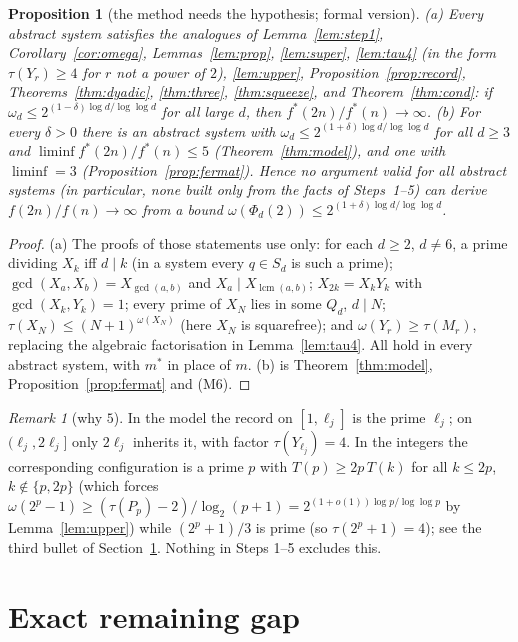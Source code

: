 \documentclass[11pt]{article}
\newtheorem{proposition}[theorem]{Proposition}
\theoremstyle{remark}
\newtheorem{remark}[theorem]{Remark}
\newcommand{\lcm}{\operatorname{lcm}}
\begin{document}
\begin{proposition}[the method needs the hypothesis; formal version]\label{prop:formal}
(a) Every abstract system satisfies the analogues of Lemma~\ref{lem:step1},
Corollary~\ref{cor:omega}, Lemmas~\ref{lem:prop}, \ref{lem:super}, \ref{lem:tau4} (in the form
$\tau(Y_r)\ge4$ for $r$ not a power of $2$), \ref{lem:upper}, Proposition~\ref{prop:record},
Theorems~\ref{thm:dyadic}, \ref{thm:three}, \ref{thm:squeeze}, and Theorem~\ref{thm:cond}: if
$\omega_d\le2^{(1-\delta)\log d/\log\log d}$ for all large $d$, then $f^*(2n)/f^*(n)\to\infty$.
(b) For every $\delta>0$ there is an abstract system with $\omega_d\le2^{(1+\delta)\log d/\log\log d}$
for all $d\ge3$ and $\liminf f^*(2n)/f^*(n)\le5$ (Theorem~\ref{thm:model}), and one with
$\liminf=3$ (Proposition~\ref{prop:fermat}).
Hence no argument valid for all abstract systems (in particular, none built only from the facts of
Steps~1--5) can derive $f(2n)/f(n)\to\infty$ from a bound $\omega(\Phi_d(2))\le
2^{(1+\delta)\log d/\log\log d}$.
\end{proposition}
\begin{proof}
(a) The proofs of those statements use only: for each $d\ge2$, $d\ne6$, a prime dividing $X_k$ iff
$d\mid k$ (in a system every $q\in S_d$ is such a prime); $\gcd(X_a,X_b)=X_{\gcd(a,b)}$ and
$X_a\mid X_{\lcm(a,b)}$; $X_{2k}=X_kY_k$ with $\gcd(X_k,Y_k)=1$; every prime of $X_N$ lies in some
$Q_d$, $d\mid N$; $\tau(X_N)\le(N+1)^{\omega(X_N)}$ (here $X_N$ is squarefree); and
$\omega(Y_r)\ge\tau(M_r)$, replacing the algebraic factorisation in Lemma~\ref{lem:tau4}. All hold
in every abstract system, with $m^*$ in place of $m$. (b) is Theorem~\ref{thm:model},
Proposition~\ref{prop:fermat} and (M6).
\end{proof}

\begin{remark}[why $5$]
In the model the record on $[1,\ell_j]$ is the prime $\ell_j$; on $(\ell_j,2\ell_j]$ only
$2\ell_j$ inherits it, with factor $\tau(Y_{\ell_j})=4$. In the integers the corresponding
configuration is a prime $p$ with $T(p)\ge2p\,T(k)$ for all $k\le2p$, $k\notin\{p,2p\}$ (which
forces $\omega(2^p-1)\ge(\tau(P_p)-2)/\log_2(p+1)=2^{(1+o(1))\log p/\log\log p}$ by
Lemma~\ref{lem:upper}) while $(2^p+1)/3$ is prime (so $\tau(2^p+1)=4$); see the third bullet of
Section~\ref{sec:gap}. Nothing in Steps 1--5 excludes this.
\end{remark}

\section{Exact remaining gap}\label{sec:gap}
\end{document}
